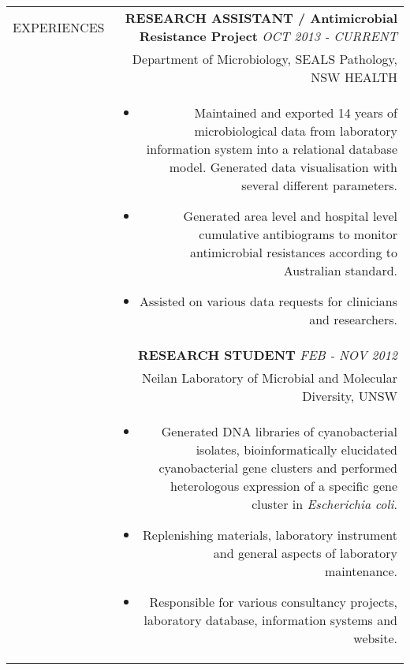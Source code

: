 \documentclass[a4paper,10pt]{article}
\newcommand\VRule{\color{lightgray}\vrule}
\newcommand\HRule{}
\begin{document}
\begin{tabular}{L!{\VRule}R}
\uppercase{Experiences} \HRule 
 & \textbf{\uppercase{Research Assistant} / Antimicrobial Resistance Project} \hfill\small \textit{OCT 2013 - CURRENT}\\
 & {Department of Microbiology, SEALS Pathology, NSW HEALTH} \\
 & \begin{itemize}
\item Maintained and exported 14 years of microbiological data from laboratory information system into a relational database model. Generated data visualisation with several different parameters.
\item Generated area level and hospital level cumulative antibiograms to monitor antimicrobial resistances according to Australian standard.
\item Assisted on various data requests for clinicians and researchers.
\end{itemize}\\


& \textbf{\uppercase{Research Student}} \hfill\small \textit{FEB - NOV 2012} \\
& Neilan Laboratory of Microbial and Molecular Diversity, UNSW\\
& \begin{itemize}
\item Generated DNA libraries of cyanobacterial isolates, bioinformatically elucidated cyanobacterial gene clusters and performed heterologous expression of a specific gene cluster in \textit{Escherichia coli}.
\item Replenishing materials, laboratory instrument and general aspects of laboratory maintenance.
\item Responsible for various consultancy projects, laboratory database, information systems and website.
\vspace{-.5cm}
\end{itemize}

\end{tabular}


\vspace{0.15in}
\end{document}
